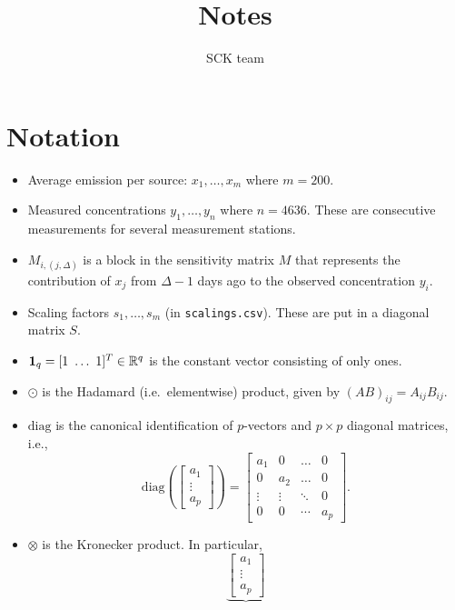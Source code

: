 \documentclass{article}
\title{Notes}
\author{SCK team}
\date{}
\begin{document}
    \maketitle

\section{Notation}
\begin{itemize}
    \item Average emission per source: $x_1,\dots,x_m$ where $m = 200$.
    \item Measured concentrations $y_1,\dots,y_n$ where $n = 4636$. These are consecutive measurements for several measurement stations. 
    \item $M_{i,(j,\Delta)}$ is a block in the sensitivity matrix $M$ that represents the contribution of $x_j$ from $\Delta - 1$ days ago to the observed concentration $y_i$.
    \item Scaling factors $s_1,\dots,s_m$ (in \texttt{scalings.csv}). These are put in a diagonal matrix $S$.
    \item $\vb{1}_q = [1\,\, \dots\,\, 1]^T \in \mathbb{R}^q$ is the constant vector consisting of only ones.
    \item $\odot$ is the Hadamard (i.e.\, elementwise) product, given by $(AB)_{ij} = A_{ij} B_{ij}$.
    \item $\mathrm{diag}$ is the canonical identification of $p$-vectors and $p \times p$ diagonal matrices, i.e.,
    $$
    \mathrm{diag}\left(
    \begin{bmatrix}
        a_1 \\ 
        \vdots \\
        a_p
    \end{bmatrix}
    \right)
    =
    \begin{bmatrix}
        a_1 & 0 & \dots & 0 \\
        0 & a_2 & \dots & 0 \\
        \vdots & \vdots & \ddots & 0 \\
        0 & 0 & \cdots & a_p
    \end{bmatrix}
    .$$
    \item $\otimes$ is the Kronecker product. In particular,
        $$
        \underbrace{
        \begin{bmatrix}
            a_1 \\
            \vdots \\
            a_p
        \end{bmatrix}
}$$
\end{itemize}
\end{document}
